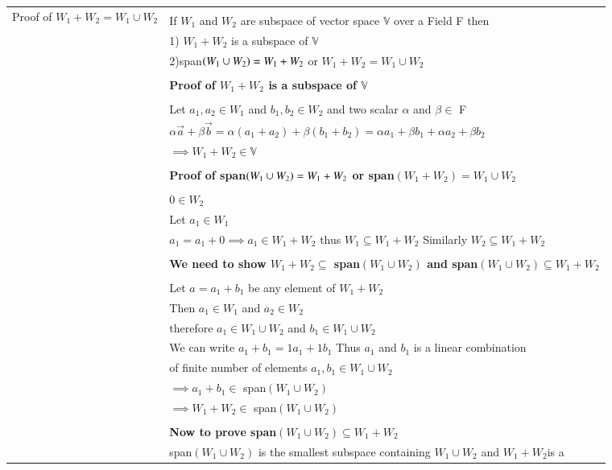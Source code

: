 \documentclass[journal,12pt]{IEEEtran}
\begin{document}
\begin{longtable}{|l|l|}
\hline
\multirow{3}{*}{Proof of $W_1+W_2={W_1\cup W_2}$ } & \\
& If $W_1$ and $W_2$ are subspace of vector space $\mathbb{V}$ over a Field F then\\
&1) $W_1+W_2$ is a subspace of $\mathbb{V}$\\
&2)span$\left(W_1\cup W_2\right)=W_1+W_2$ or $W_1+W_2={W_1\cup W_2}$\\
&\\
&\textbf{Proof of $W_1+W_2$ is a subspace of $\mathbb{V}$ }\\
&\\
&Let $a_1 ,a_2 \in W_1$ and $b_1,b_2 \in W_2$ and two scalar $\alpha$ and $\beta \in$ F\\
&$\alpha\vec{a}+\beta\vec{b}=\alpha(a_1+a_2)+\beta(b_1+b_2)=\alpha a_1+\beta b_1+\alpha a_2+\beta b_2$\\
&$\implies W_1+W_2\in\mathbb{V}$\\
&\\
&\textbf{Proof of span$\left(W_1\cup W_2\right)=W_1+W_2$ or span$(W_1+W_2)={W_1\cup W_2}$ }\\
&\\
&$0\in W_2$\\
&Let $a_1\in W_1$\\
&$a_1=a_1+0\implies a_1\in W_1+W_2$ thus $W_1\subseteq W_1+W_2$ Similarly $W_2\subseteq W_1+W_2$\\
&\\
&\textbf{We need to show $W_1+W_2\subseteq$ span$(W_1\cup W_2)$ and span$(W_1\cup W_2)\subseteq W_1+W_2$}\\ 
&\\
&Let $a=a_1+b_1$ be any element of $W_1+W_2$\\
&Then $a_1\in W_1$ and $a_2\in W_2$\\
&therefore $a_1\in W_1\cup W_2$ and $b_1\in W_1\cup W_2$\\
&We can write $a_1+b_1=1a_1+1b_1$ Thus $a_1$ and $b_1$ is a linear combination \\
&of finite number of elements $a_1,b_1\in W_1\cup W_2$\\
&$\implies a_1+b_1\in$ span$(W_1 \cup W_2)$\\
&$\implies W_1+W_2\in$ span$(W_1 \cup W_2)$\\
&\\
&\textbf{Now to prove span$(W_1\cup W_2)\subseteq W_1+W_2$}\\
&span$(W_1\cup W_2)$ is the smallest subspace containing $W_1\cup W_2$ and $W_1+W_2 $is a\\ 

\end{longtable}
\end{document}
